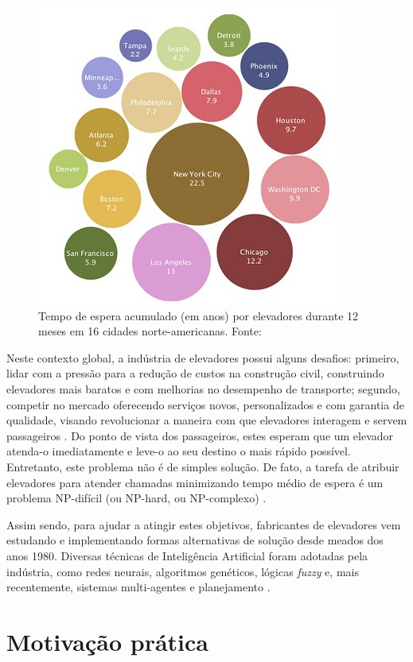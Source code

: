 \begin{figure}[htb!]
\centering\includegraphics{img/time-cost.jpg}
\caption{\label{fig:fig1}Tempo de espera acumulado (em anos) por elevadores durante 12 meses em 16 cidades norte-americanas. Fonte: \cite{IBM10}}
\end{figure}

Neste contexto global, a indústria de elevadores possui alguns desafios: primeiro, lidar com a pressão para a redução de custos na construção civil, construindo elevadores mais baratos e com melhorias no desempenho de transporte; segundo, competir no mercado oferecendo serviços novos, personalizados e com garantia de qualidade, visando revolucionar a maneira com que elevadores interagem e servem passageiros \cite{KOEHLEROTTIGER02}. Do ponto de vista dos passageiros, estes esperam que um elevador atenda-o imediatamente e leve-o ao seu destino o mais rápido possível. Entretanto, este problema não é de simples solução. De fato, a tarefa de atribuir elevadores para atender chamadas minimizando tempo médio de espera é um problema NP-difícil (ou NP-hard, ou NP-complexo) \cite{SeKo99}.

Assim sendo, para ajudar a atingir estes objetivos, fabricantes de elevadores vem estudando e implementando formas alternativas de solução desde meados dos anos 1980. Diversas técnicas de Inteligência Artificial foram adotadas pela indústria, como redes neurais, algoritmos genéticos, lógicas \textit{fuzzy} e, mais recentemente, sistemas multi-agentes e planejamento \cite{KOEHLEROTTIGER02}.

\section{Motivação prática}

